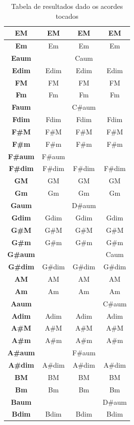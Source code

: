 \begin{table}[ht!]
{\begin{tabular}{ | c | c | c | c |}
  \hline
  \textbf{EM} & EM & EM & EM \\ 
  \hline
  \textbf{Em} & Em & Em & Em \\ 
  \hline
  \textbf{Eaum} & \color{red}{Caum} & Caum & \color{red}{Caum} \\ 
  \hline
  \textbf{Edim} & Edim & Edim & Edim \\ 
  \hline
  \textbf{FM} & FM & FM & FM \\ 
  \hline
  \textbf{Fm} & Fm & Fm & Fm \\ 
  \hline
  \textbf{Faum} & \color{red}{C\#aum} & C\#aum & \color{red}{C\#aum} \\ 
  \hline
  \textbf{Fdim} & Fdim & Fdim & Fdim \\ 
  \hline
  \textbf{F\#M} & F\#M & F\#M & F\#M \\ 
  \hline
  \textbf{F\#m} & F\#m & F\#m & F\#m \\ 
  \hline
  \textbf{F\#aum} & F\#aum & \color{red}{F\#aum} & \color{red}{F\#aum} \\ 
  \hline
  \textbf{F\#dim} & F\#dim & F\#dim & F\#dim \\ 
  \hline
  \textbf{GM} & GM & GM & GM \\ 
  \hline
  \textbf{Gm} & Gm & Gm & Gm \\ 
  \hline
  \textbf{Gaum} & \color{red}{D\#aum} & D\#aum & \color{red}{D\#aum} \\ 
  \hline
  \textbf{Gdim} & Gdim & Gdim & Gdim \\ 
  \hline
  \textbf{G\#M} & G\#M & G\#M & G\#M \\ 
  \hline
  \textbf{G\#m} & G\#m & G\#m & G\#m \\ 
  \hline
  \textbf{G\#aum} & \color{red}{Caum} & \color{red}{Caum} & Caum \\ 
  \hline
  \textbf{G\#dim} & G\#dim & G\#dim & G\#dim \\ 
  \hline
  \textbf{AM} & AM & AM & AM \\ 
  \hline
  \textbf{Am} & Am & Am & Am \\ 
  \hline
  \textbf{Aaum} & \color{red}{C\#aum} & \color{red}{C\#aum} & C\#aum \\ 
  \hline
  \textbf{Adim} & Adim & Adim & Adim \\ 
  \hline
  \textbf{A\#M} & A\#M & A\#M & A\#M \\ 
  \hline
  \textbf{A\#m} & A\#m & A\#m & A\#m \\ 
  \hline
  \textbf{A\#aum} & \color{red}{F\#aum} & F\#aum & \color{red}{F\#aum} \\ 
  \hline
  \textbf{A\#dim} & A\#dim & A\#dim & A\#dim \\ 
  \hline
  \textbf{BM} & BM & BM & BM \\ 
  \hline
  \textbf{Bm} & Bm & Bm & Bm \\ 
  \hline
  \textbf{Baum} & \color{red}{D\#aum} & \color{red}{D\#aum} & D\#aum \\ 
  \hline
  \textbf{Bdim} & Bdim & Bdim & Bdim \\ 
  \hline
\end{tabular}
}
\caption{Tabela de resultados dado os acordes tocados}
\label{tab:label_test}
\end{table}


